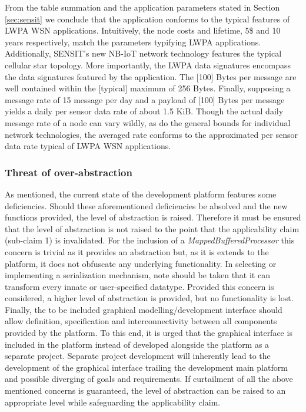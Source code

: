 From the table summation and the application parameters stated in Section \ref{sec:sensit} we conclude that the \sensit application conforms to the typical features of LWPA WSN applications. Intuitively, the node costs and lifetime, 5\$ and 10 years respectively, match the parameters typifying LWPA applications. Additionally, SENSIT's new NB-IoT network technology features the typical cellular star topology. More importantly, the LWPA data signatures encompass the data signatures featured by the \sensit application. The [100] Bytes per message are well contained within the [typical] maximum of 256 Bytes. Finally, supposing a message rate of 15 message per day and a payload of [100] Bytes per message yields a daily per sensor data rate of about 1.5 KiB. Though the actual daily message rate of a node can vary wildly, as do the general bounds for individual network technologies, the averaged rate conforms to the approximated per sensor data rate typical of LWPA WSN applications.

\subsubsection{Threat of over-abstraction}
As mentioned, the current state of the development platform features some deficiencies. Should these aforementioned deficiencies be absolved and the new functions provided, the level of abstraction is raised. Therefore it must be ensured that the level of abstraction is not raised to the point that the applicability claim (sub-claim 1) is invalidated. For the inclusion of a \emph{MappedBufferedProcessor} this concern is trivial as it provides an abstraction but, as it is extends to the platform, it does not obfuscate any underlying functionality. In selecting or implementing a serialization mechanism, note should be taken that it can transform every innate or user-specified datatype. Provided this concern is considered, a higher level of abstraction is provided, but no functionality is lost. Finally, the to be included graphical modelling/development interface should allow definition, specification and interconnectivity between all components provided by the platform. To this end, it is urged that the graphical interface is included in the platform instead of developed alongside the platform as a separate project. Separate project development will inherently lead to the development of the graphical interface trailing the development main platform and possible diverging of goals and requirements. If curtailment of all the above mentioned concerns is guaranteed, the level of abstraction can be raised to an appropriate level while safeguarding the applicability claim.

